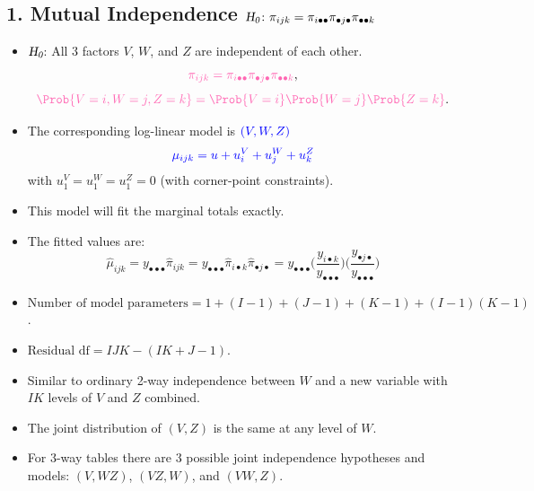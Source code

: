 \documentclass{article}\usepackage[]{graphicx}\usepackage[svgnames]{xcolor}
\let\log\relax%
\newcommand{\HN}{\textsl{H}_{\textsl{0}}}%
\begin{document}
\subsection*{1. Mutual Independence $\HN\colon \pi_{ijk}=\pi_{i\bullet\bullet}\pi_{\bullet j\bullet}\pi_{\bullet\bullet k}$}
\begin{itemize}
      \item $ \HN $: All 3 factors $V$, $W$, and $Z$ are independent of each other.
            \[ \textcolor{HotPink}{\pi_{ijk}=\pi_{i\bullet\bullet}\pi_{\bullet j\bullet}\pi_{\bullet\bullet k}}, \]
            \[ \textcolor{HotPink}{\Prob{V=i,W=j,Z=k}=\Prob{V=i}\Prob{W=j}\Prob{Z=k}}. \]
      \item The corresponding log-linear model is $ \textcolor{Blue}{(V,W,Z)} $
            \[ \textcolor{Blue}{\log{\mu}_{ijk}=u+u_i^V+u_j^W+u_k^Z} \]
            with $ u_1^V=u_1^W=u_1^Z=0 $ (with corner-point constraints).
      \item This model will fit the marginal totals exactly.
      \item The fitted values are:
            \[ \hat{\mu}_{i j k
                  }=y_{\bullet\bullet\bullet} \hat{\pi}_{ijk}
                  =y_{\bullet\bullet\bullet} \hat{\pi}_{i\bullet k} \hat{\pi}_{\bullet j\bullet}
                  =y_{\bullet\bullet\bullet}\biggl(\frac{y_{i\bullet k}}{y_{\bullet\bullet\bullet}}\biggr)
                  \biggl(\frac{y_{\bullet j\bullet}}{y_{\bullet\bullet\bullet}}\biggr) \]
      \item $ \text{Number of model parameters}=1+(I-1)+(J-1)+(K-1)+(I-1)(K-1) $.
      \item $ \text{Residual df}=IJK-(IK+J-1) $.
      \item Similar to ordinary 2-way independence between $W$ and a new variable with $IK$
            levels of $V$ and $Z$ combined.
      \item The joint distribution of $(V,Z)$ is the same at any level of $W$.
      \item For 3-way tables there are 3 possible joint independence hypotheses and models:
            $(V,WZ)$, $(VZ,W)$, and $(VW,Z)$.
\end{itemize}
\end{document}
